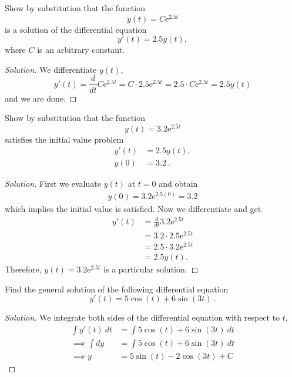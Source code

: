 \documentclass[compacto,10pt,comentarios]{aleph-notas}
\begin{document}
\begin{ejer}
    Show by substitution that the function
    $$
        y(t) = C \mathrm{e}^{2.5t}
    $$
    is a solution of the differential equation
    $$
        y'(t) = 2.5 y(t),
    $$
    where $C$ is an arbitrary constant.
\end{ejer}
\begin{proof}[Solution]
    We differentiate $y(t)$,
    $$
    y'(t) = \frac{d}{dt} C \mathrm{e}^{2.5t} = C \cdot 2.5 \mathrm{e}^{2.5t} = 2.5 \cdot C \mathrm{e}^{2.5t} = 2.5y(t)
    $$
    and we are done.
\end{proof}

\begin{ejer}
    Show by substitution that the function
    $$
        y(t) = 3.2 \mathrm{e}^{2.5t}
    $$
    satisfies the initial value problem
    \begin{align*}
        y'(t) & = 2.5 y(t), \\
        y(0) & = 3.2 ~ .
    \end{align*}
\end{ejer}
\begin{proof}[Solution]
    First we evaluate $y(t)$ at $t=0$ and obtain
    \begin{align*}
        y(0) = 3.2 \mathrm{e}^{2.5 (0)} = 3.2
    \end{align*}
    which implies the initial value is satisfied. Now we differentiate and get
    \begin{align*}
        y'(t) & = \frac{d}{dt} 3.2 \mathrm{e}^{2.5t} \\
        & = 3.2 \cdot 2.5\mathrm{e}^{2.5t} \\
        & = 2.5 \cdot 3.2 \mathrm{e}^{2.5t} \\
        & = 2.5 y(t) .
    \end{align*}
    Therefore, $y(t) = 3.2\mathrm{e}^{2.5t}$ is a particular solution.
\end{proof}

\begin{ejer}
    Find the general solution of the following differential equation
        $$
            y'(t) = 5\cos(t) + 6 \sin(3t) ~ .
        $$
\end{ejer}
\begin{proof}[Solution]
    We integrate both sides of the differential equation with respect to $t$,
    \begin{align*}
        \int y'(t) ~ dt & = \int 5\cos(t) + 6 \sin(3t) ~ dt \\
        \implies \int dy & = \int 5\cos(t) + 6 \sin(3t) ~ dt \\
        \implies y & = 5\sin(t) - 2\cos(3t) + C
    \end{align*}
\end{proof}
\end{document}
